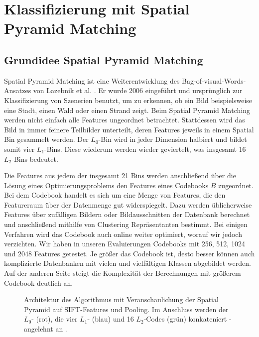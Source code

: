 \section{Klassifizierung mit Spatial Pyramid Matching}

\subsection{Grundidee Spatial Pyramid Matching}

Spatial Pyramid Matching ist eine Weiterentwicklung des Bag-of-visual-Words-Ansatzes von Lazebnik et al. \cite{lsp06}. Er wurde 2006 eingeführt und ursprünglich zur Klassifizierung von Szenerien benutzt, um zu erkennen, ob ein Bild beispielsweise eine Stadt, einen Wald oder einen Strand zeigt. Beim Spatial Pyramid Matching werden nicht einfach alle Features ungeordnet betrachtet. Stattdessen wird das Bild in immer feinere Teilbilder unterteilt, deren Features jeweils in einem Spatial Bin gesammelt werden. Der $L_0$-Bin wird in jeder Dimension halbiert und bildet somit vier $L_1$-Bins. Diese wiederum werden wieder geviertelt, was insgesamt 16 $L_2$-Bins bedeutet.

Die Features aus jedem der insgesamt 21 Bins werden anschließend über die Lösung eines Optimierungsproblems den Features eines Codebooks $B$ zugeordnet. Bei dem Codebook handelt es sich um eine Menge von Features, die den Featureraum über der Datenmenge gut widerspiegelt. Dazu werden üblicherweise Features über zufälligen Bildern oder Bildausschnitten der Datenbank berechnet und anschließend mithilfe von Clustering Repräsentanten bestimmt. Bei einigen Verfahren wird das Codebook auch online weiter optimiert, worauf wir jedoch verzichten. Wir haben in unseren Evaluierungen Codebooks mit 256, 512, 1024 und 2048 Features getestet. Je größer das Codebook ist, desto besser können auch komplizierte Datenbanken mit vielen und vielfältigen Klassen abgebildet werden. Auf der anderen Seite steigt die Komplexität der Berechnungen mit größerem Codebook deutlich an.

\begin{figure}
	\centering
	\caption{Architektur des Algorithmus mit Veranschaulichung der Spatial Pyramid auf SIFT-Features und Pooling. Im Anschluss werden der $L_0$- (rot), die vier $L_1$- (blau) und 16 $L_2$-Codes (grün) konkateniert - angelehnt an \cite{yygh09}.}
	\label{img:architecture}
\end{figure}

